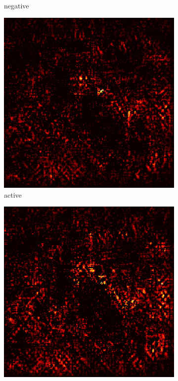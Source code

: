 \documentclass[preprint,12pt]{elsarticle}
\begin{document}
\begin{figure}
\begin{subfigure}{0.14\textwidth}
        \caption{negative}
    \end{subfigure}
    \hfill
    \begin{subfigure}{0.14\textwidth}
        \centering
        \includegraphics[width=\linewidth]{../visualizations/examples/imagenette/resnet18/active_saliency_map/2.png}
        \caption{active}
    \end{subfigure}
    \hfill
    \begin{subfigure}{0.14\textwidth}
        \centering
        \includegraphics[width=\linewidth]{../visualizations/examples/imagenette/resnet18/inactive_saliency_map/2.png}

\end{subfigure}
\end{figure}
\end{document}
